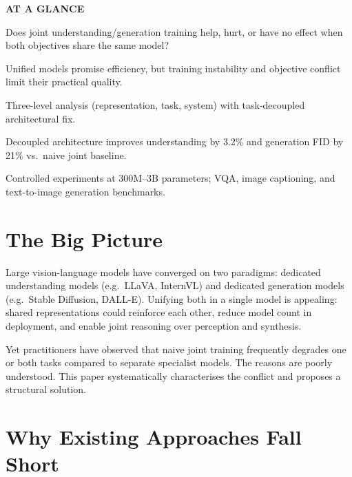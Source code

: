 \documentclass[10pt,twocolumn]{article}
\begin{document}
\begin{mdframed}[backgroundcolor=boxgray,linecolor=rulered,linewidth=1pt,
    innerleftmargin=6pt,innerrightmargin=6pt,
    innertopmargin=6pt,innerbottommargin=6pt]
\textbf{\small AT A GLANCE}\par\vspace{4pt}
\begin{description}[leftmargin=0pt,labelsep=4pt,itemsep=2pt,parsep=0pt,
    font=\small\bfseries]
  \item[Problem:] Does joint understanding/generation training help,
    hurt, or have no effect when both objectives share the same model?
  \item[Why it matters:] Unified models promise efficiency, but training
    instability and objective conflict limit their practical quality.
  \item[Method:] Three-level analysis (representation, task, system)
    with task-decoupled architectural fix.
  \item[Result:] Decoupled architecture improves understanding by 3.2\%
    and generation FID by 21\% vs.\ naive joint baseline.
  \item[Evidence:] Controlled experiments at 300M--3B parameters; VQA,
    image captioning, and text-to-image generation benchmarks.
\end{description}
\end{mdframed}

\section{The Big Picture}

Large vision-language models have converged on two paradigms: dedicated
understanding models (e.g.\ LLaVA, InternVL) and dedicated generation
models (e.g.\ Stable Diffusion, DALL-E). Unifying both in a single model
is appealing: shared representations could reinforce each other, reduce
model count in deployment, and enable joint reasoning over perception
and synthesis.

Yet practitioners have observed that naive joint training frequently
degrades one or both tasks compared to separate specialist models. The
reasons are poorly understood. This paper systematically characterises
the conflict and proposes a structural solution.

\section{Why Existing Approaches Fall Short}
\end{document}
